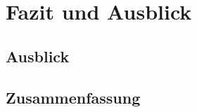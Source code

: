 \documentclass[thesis.tex]{subfiles}
\begin{document}
\chapter{Fazit und Ausblick}\label{chap:fazit}

\section{Ausblick}
\section{Zusammenfassung}

\subfilebib %
\end{document}
